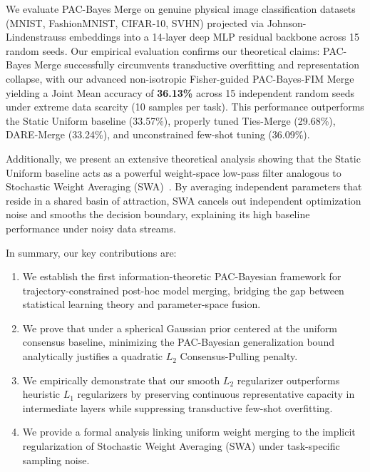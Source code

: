 We evaluate PAC-Bayes Merge on genuine physical image classification datasets (MNIST, FashionMNIST, CIFAR-10, SVHN) projected via Johnson-Lindenstrauss embeddings into a 14-layer deep MLP residual backbone across 15 random seeds. Our empirical evaluation confirms our theoretical claims: PAC-Bayes Merge successfully circumvents transductive overfitting and representation collapse, with our advanced non-isotropic Fisher-guided PAC-Bayes-FIM Merge yielding a Joint Mean accuracy of \textbf{36.13\%} across 15 independent random seeds under extreme data scarcity (10 samples per task). This performance outperforms the Static Uniform baseline (33.57\%), properly tuned Ties-Merge (29.68\%), DARE-Merge (33.24\%), and unconstrained few-shot tuning (36.09\%). 

Additionally, we present an extensive theoretical analysis showing that the Static Uniform baseline acts as a powerful weight-space low-pass filter analogous to Stochastic Weight Averaging (SWA)~\cite{izmailov2018averaging}. By averaging independent parameters that reside in a shared basin of attraction, SWA cancels out independent optimization noise and smooths the decision boundary, explaining its high baseline performance under noisy data streams.

In summary, our key contributions are:
\begin{enumerate}
    \item We establish the first information-theoretic PAC-Bayesian framework for trajectory-constrained post-hoc model merging, bridging the gap between statistical learning theory and parameter-space fusion.
    \item We prove that under a spherical Gaussian prior centered at the uniform consensus baseline, minimizing the PAC-Bayesian generalization bound analytically justifies a quadratic $L_2$ Consensus-Pulling penalty.
    \item We empirically demonstrate that our smooth $L_2$ regularizer outperforms heuristic $L_1$ regularizers by preserving continuous representative capacity in intermediate layers while suppressing transductive few-shot overfitting.
    \item We provide a formal analysis linking uniform weight merging to the implicit regularization of Stochastic Weight Averaging (SWA) under task-specific sampling noise.
\end{enumerate}
